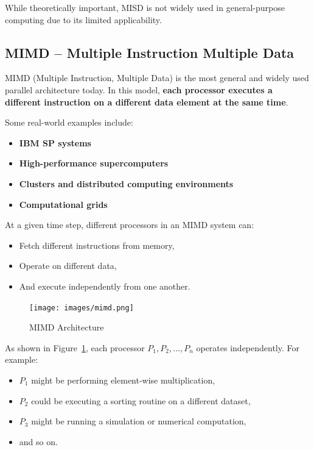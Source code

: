 \documentclass[12pt]{book}
\begin{document}
While theoretically important, MISD is not widely used in general-purpose computing due to its limited applicability.

\bigskip

\subsection{MIMD – Multiple Instruction Multiple Data}

MIMD (Multiple Instruction, Multiple Data) is the most general and widely used parallel architecture today. In this model, \textbf{each processor executes a different instruction on a different data element at the same time}.

\medskip

Some real-world examples include:
\begin{itemize}
    \item \textbf{IBM SP systems}
    \item \textbf{High-performance supercomputers}
    \item \textbf{Clusters and distributed computing environments}
    \item \textbf{Computational grids}
\end{itemize}

\medskip

At a given time step, different processors in an MIMD system can:
\begin{itemize}
    \item Fetch different instructions from memory,
    \item Operate on different data,
    \item And execute independently from one another.
\end{itemize}

\begin{figure}[H]
    \centering
    \texttt{[image: images/mimd.png]}
    \caption{MIMD Architecture}
    \label{fig:mimd}
\end{figure}

As shown in Figure~\ref{fig:mimd}, each processor $P_1, P_2, \dots, P_n$ operates independently. For example:
\begin{itemize}
    \item $P_1$ might be performing element-wise multiplication,
    \item $P_2$ could be executing a sorting routine on a different dataset,
    \item $P_3$ might be running a simulation or numerical computation,
    \item and so on.
\end{itemize}
\end{document}
